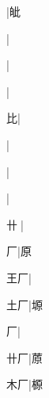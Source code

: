\begin{multicols}{2}
{{\cjk{}{\cnsym{}　}{\cnsym{}　}{\cnsym{}　}}|{\cjk{}皉}\par
{}|{}\par
{\cjk{}{\cnsym{}　}{\cnsym{}　}{\cnsym{}　}}|{}\par
{\cjk{}{\cnsym{}　}{\cnsym{}　}{\cnsym{}　}}|{}\par
{\cjk{}{\cnsym{}　}{\cnsym{}　}比}|{}\par
{\cjk{}{\cnsym{}　}{\cnsym{}　}{\cnsym{}　}}|{}\par
{\cjk{}{\cnsym{}　}{\cnsym{}　}{\cnsym{}　}}|{}\par
{\cjk{}{\cnsym{}　}{\cnsym{}　}{\cnsym{}　}}|{}\par
{\cjk{}{\cnsym{}　}卄{\cnxJzr{}}}|{}\par
{\cjk{}{\cnsym{}　}{\cnsym{}　}厂}|{\cjk{}原}\par
{\cjk{}{\cnsym{}　}王厂}|{}\par
{\cjk{}{\cnsym{}　}土厂}|{\cjk{}塬}\par
{厂}|{}\par
{\cjk{}{\cnsym{}　}卄厂}|{\cjk{}蒝}\par
{\cjk{}{\cnsym{}　}木厂}|{\cjk{}榞}\par
}
\end{multicols}

